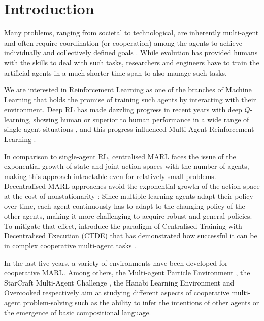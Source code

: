 \section{Introduction}

Many problems, ranging from societal to technological, are inherently multi-agent and often require coordination (or cooperation) among the agents to achieve individually and collectively defined goals \citep{cao_2013_autonomous, klima_2018_space}. While evolution has provided humans with the skills to deal with such tasks, researchers and engineers have to train the artificial agents in a much shorter time span to also manage such tasks. 

We are interested in Reinforcement Learning \citep[RL]{sutton_barto_2018_rlbook} as one of the branches of Machine Learning that holds the promise of training such agents by interacting with their environment. Deep RL has made dazzling progress in recent years with deep $Q$-learning, showing human or superior to human performance in a wide range of single-agent situations \citep{dqn_mnih_2015}, and this progress influenced Multi-Agent Reinforcement Learning \citep[MARL]{panait_cooperative_2005_marl}.

In comparison to single-agent RL, centralised MARL faces the issue of the exponential growth of state and joint action spaces with the number of agents, making this approach intractable even for relatively small problems. Decentralised MARL approaches avoid the exponential growth of the action space at the cost of nonstationarity \cite{laurent_world_2011_non-markovian}: Since multiple learning agents adapt their policy over time, each agent continuously has to adapt to the changing policy of the other agents, making it more challenging to acquire robust and general policies. To mitigate that effect, \citet{oliehoek_optimal_2008_ctde} introduce the paradigm of Centralised Training with Decentralised Execution (CTDE) that has demonstrated how successful it can be in complex cooperative multi-agent tasks \citep{vdn_sunehag_value-decomposition_2018, rashid_qmix_2018, Avalos2022LocalLearningAAMAS}.

In the last five years, a variety of environments have been developed for cooperative MARL. Among others, the Multi-agent Particle Environment \cite[MPE]{mpe_lowe2017multi, mpe_mordatch2017emergence}, the StarCraft Multi-Agent Challenge \cite[SMAC]{samvelyan19smac}, the Hanabi Learning Environment \cite[HLE]{bard_hanabi_2020} and Overcooked \cite{overcooked_wu_wang2021too} respectively aim at studying different aspects of cooperative multi-agent problem-solving such as the ability to infer the intentions of other agents or the emergence of basic compositional language.

